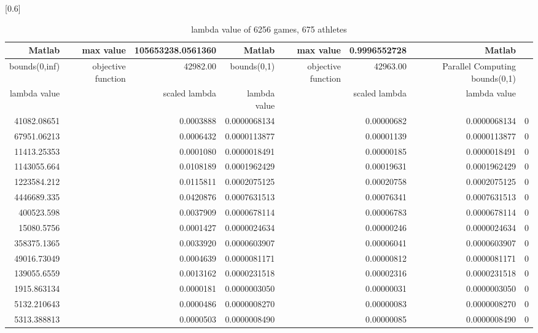 \documentclass[
journal=jacsat, %
manuscript=article]{achemso}
\begin{document}
\begin{table}[htbp]
  \centering
  \caption{lambda value of 6256 games, 675 athletes}
  \scalebox{0.6}[0.6]{%
    \begin{tabular}{rrrrrrrr}
    \toprule
        Matlab & max value & 105653238.0561360 & Matlab & max value & 0.9996552728 & Matlab \\
    \hline
    bounds(0,inf) & objective function & 42982.00 & bounds(0,1) & objective function & 42963.00 &  Parallel Computing bounds(0,1) \\
    \hline
    lambda value &       & scaled lambda & lambda value  &       & scaled lambda & lambda value  \\
    \bottomrule
    41082.08651 &       & 0.0003888 & 0.0000068134 &       & 0.00000682 & 0.0000068134 & 0 \\
    67951.06213 &       & 0.0006432 & 0.0000113877 &       & 0.00001139 & 0.0000113877 & 0 \\
    11413.25353 &       & 0.0001080 & 0.0000018491 &       & 0.00000185 & 0.0000018491 & 0 \\
    1143055.664 &       & 0.0108189 & 0.0001962429 &       & 0.00019631 & 0.0001962429 & 0 \\
    1223584.212 &       & 0.0115811 & 0.0002075125 &       & 0.00020758 & 0.0002075125 & 0 \\
    4446689.335 &       & 0.0420876 & 0.0007631513 &       & 0.00076341 & 0.0007631513 & 0 \\
    400523.598 &       & 0.0037909 & 0.0000678114 &       & 0.00006783 & 0.0000678114 & 0 \\
    15080.5756 &       & 0.0001427 & 0.0000024634 &       & 0.00000246 & 0.0000024634 & 0 \\
    358375.1365 &       & 0.0033920 & 0.0000603907 &       & 0.00006041 & 0.0000603907 & 0 \\
    49016.73049 &       & 0.0004639 & 0.0000081171 &       & 0.00000812 & 0.0000081171 & 0 \\
    139055.6559 &       & 0.0013162 & 0.0000231518 &       & 0.00002316 & 0.0000231518 & 0 \\
    1915.863134 &       & 0.0000181 & 0.0000003050 &       & 0.00000031 & 0.0000003050 & 0 \\
    5132.210643 &       & 0.0000486 & 0.0000008270 &       & 0.00000083 & 0.0000008270 & 0 \\
    5313.388813 &       & 0.0000503 & 0.0000008490 &       & 0.00000085 & 0.0000008490 & 0 \\

\end{tabular}}
\end{table}
\end{document}
